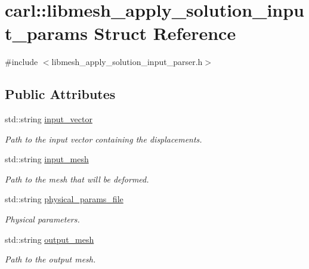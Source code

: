 \hypertarget{structcarl_1_1libmesh__apply__solution__input__params}{}\section{carl\+:\+:libmesh\+\_\+apply\+\_\+solution\+\_\+input\+\_\+params Struct Reference}
\label{structcarl_1_1libmesh__apply__solution__input__params}


{\ttfamily \#include $<$libmesh\+\_\+apply\+\_\+solution\+\_\+input\+\_\+parser.\+h$>$}

\subsection*{Public Attributes}
\begin{DoxyCompactItemize}
\item 
std\+::string \hyperlink{structcarl_1_1libmesh__apply__solution__input__params_a0a4b0ce9385310f7378137e37d67c41f}{input\+\_\+vector}
\begin{DoxyCompactList}\small\item\em Path to the input vector containing the displacements. \end{DoxyCompactList}\item 
std\+::string \hyperlink{structcarl_1_1libmesh__apply__solution__input__params_a33971a2a268cd16c0cde8b5c409a82c2}{input\+\_\+mesh}
\begin{DoxyCompactList}\small\item\em Path to the mesh that will be deformed. \end{DoxyCompactList}\item 
std\+::string \hyperlink{structcarl_1_1libmesh__apply__solution__input__params_af880101c2a6abd220f3493093fe46fcc}{physical\+\_\+params\+\_\+file}
\begin{DoxyCompactList}\small\item\em Physical parameters. \end{DoxyCompactList}\item 
std\+::string \hyperlink{structcarl_1_1libmesh__apply__solution__input__params_a02068cf34d7ddcd7500fff976e8b8950}{output\+\_\+mesh}
\begin{DoxyCompactList}\small\item\em Path to the output mesh. \end{DoxyCompactList}\end{DoxyCompactItemize}


